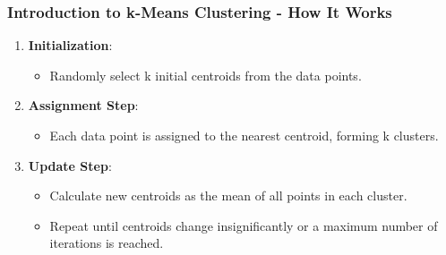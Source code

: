 \documentclass[aspectratio=169]{beamer}
\begin{document}
\begin{frame}[fragile]
    \frametitle{Introduction to k-Means Clustering - How It Works}
    \begin{enumerate}
        \item \textbf{Initialization}:
            \begin{itemize}
                \item Randomly select k initial centroids from the data points.
            \end{itemize}
        \item \textbf{Assignment Step}:
            \begin{itemize}
                \item Each data point is assigned to the nearest centroid, forming k clusters.
            \end{itemize}
        \item \textbf{Update Step}:
            \begin{itemize}
                \item Calculate new centroids as the mean of all points in each cluster.
                \item Repeat until centroids change insignificantly or a maximum number of iterations is reached.
            \end{itemize}
    \end{enumerate}
\end{frame}
\end{document}
